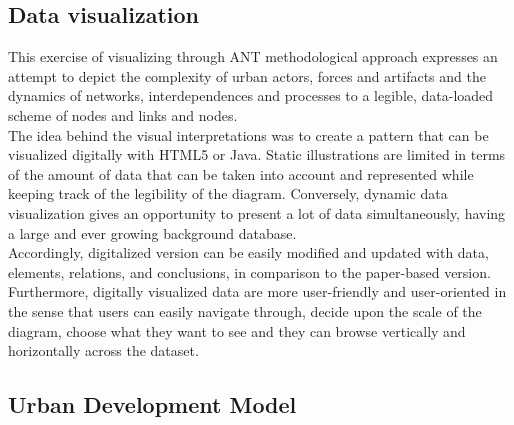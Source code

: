 \documentclass[11pt]{report}
\begin{document}
\subsection{Data visualization}

This exercise of visualizing through ANT methodological approach expresses an attempt to depict the complexity of urban actors, forces and artifacts and the dynamics of networks, interdependences and processes to a legible, data-loaded scheme of nodes and links and nodes. 
\\
The idea behind the visual interpretations was to create a pattern that can be visualized digitally with HTML5 or Java.
Static illustrations are limited in terms of the amount of data that can be taken into account and represented while keeping track of the legibility of the diagram.
Conversely, dynamic data visualization gives an opportunity to present a lot of data simultaneously, having a large and ever growing background database. 
\\
Accordingly, digitalized version can be easily modified and updated with data, elements, relations, and conclusions, in comparison to the paper-based version.
Furthermore, digitally visualized data are more user-friendly and user-oriented in the sense that users can easily navigate through, decide upon the scale of the diagram, choose what they want to see and they can browse vertically and horizontally across the dataset.

\subsection{Urban Development Model}
\end{document}
